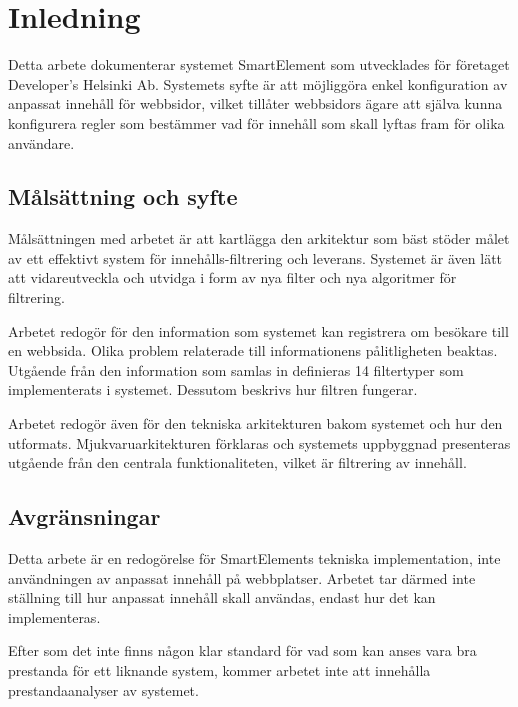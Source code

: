 \section{Inledning}

Detta arbete dokumenterar systemet SmartElement som utvecklades för företaget Developer’s Helsinki Ab. Systemets syfte är att möjliggöra enkel konfiguration av anpassat innehåll för webbsidor, vilket tillåter webbsidors ägare att själva kunna konfigurera regler som bestämmer vad för innehåll som skall lyftas fram för olika användare.

\subsection{Målsättning och syfte}

Målsättningen med arbetet är att kartlägga den arkitektur som bäst stöder målet av ett effektivt system för innehålls-filtrering och leverans. Systemet är även lätt att vidareutveckla och utvidga i form av nya filter och nya algoritmer för filtrering.

Arbetet redogör för den information som systemet kan registrera om besökare till en webbsida. Olika problem relaterade till informationens pålitligheten beaktas. Utgående från den information som samlas in definieras 14 filtertyper som implementerats i systemet. Dessutom beskrivs hur filtren fungerar. 

Arbetet redogör även för den tekniska arkitekturen bakom systemet och hur den utformats. Mjukvaruarkitekturen förklaras och systemets uppbyggnad presenteras utgående från den centrala funktionaliteten, vilket är filtrering av innehåll.

\subsection{Avgränsningar}

Detta arbete är en redogörelse för SmartElements tekniska implementation, inte användningen av anpassat innehåll på webbplatser. Arbetet tar därmed inte ställning till hur anpassat innehåll skall användas, endast hur det kan implementeras.

Efter som det inte finns någon klar standard för vad som kan anses vara bra prestanda för ett liknande system, kommer arbetet inte att innehålla prestandaanalyser av systemet.

